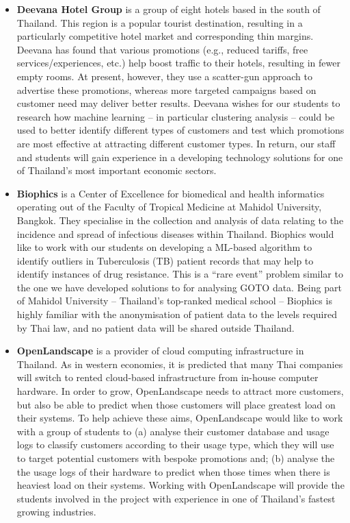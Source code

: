 \documentclass[11pt]{article}
\begin{document}
\begin{itemize}
  \item {\bf Deevana Hotel Group} is a group of eight hotels based in the south of Thailand. This region is a popular tourist destination, resulting in a particularly competitive hotel market and corresponding thin margins. Deevana has found that various promotions (e.g., reduced tariffs, free services/experiences, etc.) help boost traffic to their hotels, resulting in fewer empty rooms. At present, however, they use a scatter-gun approach to advertise these promotions, whereas more targeted campaigns based on customer need may deliver better results. Deevana wishes for our students to research how machine learning -- in particular clustering analysis -- could be used to better identify different types of customers and test which promotions are most effective at attracting different customer types. In return, our staff and students will gain experience in a developing technology solutions for one of Thailand's most important economic sectors.
  \item {\bf Biophics} is a Center of Excellence for biomedical and health informatics operating out of the Faculty of Tropical Medicine at Mahidol University, Bangkok. They specialise in the collection and analysis of data relating to the incidence and spread of infectious diseases within Thailand. Biophics would like to work with our students on developing a ML-based algorithm to identify outliers in Tuberculosis (TB) patient records that may help to identify instances of drug resistance. This is a ``rare event'' problem similar to the one we have developed solutions to for analysing GOTO data. Being part of Mahidol University -- Thailand's top-ranked medical school -- Biophics is highly familiar with the anonymisation of patient data to the levels required by Thai law, and no patient data will be shared outside Thailand.
  \item {\bf OpenLandscape} is a provider of cloud computing infrastructure in Thailand. As in western economies, it is predicted that many Thai companies will switch to rented cloud-based infrastructure from in-house computer hardware. In order to grow, OpenLandscape needs to attract more customers, but also be able to predict when those customers will place greatest load on their systems. To help achieve these aims, OpenLandscape would like to work with a group of students to (a) analyse their customer database and usage logs to classify customers according to their usage type, which they will use to target potential customers with bespoke promotions and; (b) analyse the the usage logs of their hardware to predict when those times when there is heaviest load on their systems. Working with OpenLandscape will provide the students involved in the project with experience in one of Thailand's fastest growing industries.
\end{itemize}
\end{document}
